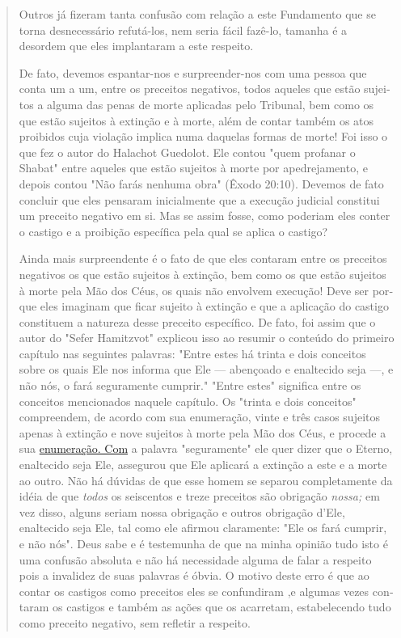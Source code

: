 \begin{quote}
Outros já fizeram tanta confusão com relação a este Fundamento que se
torna desnecessário refutá-los, nem seria fácil fazê-lo, tamanha é a
desordem que eles implantaram a este respeito.

De fato, devemos espantar-nos e surpreender-nos com uma pessoa que conta
um a um, entre os preceitos negativos, todos aqueles que estão sujei­tos
a alguma das penas de morte aplicadas pelo Tribunal, bem como os que
estão sujeitos à extinção e à morte, além de contar também os atos
proibidos cuja violação implica numa daquelas formas de morte! Foi isso
o que fez o au­tor do Halachot Guedolot. Ele contou "quem profanar o
Shabat" entre aqueles que estão sujeitos à morte por apedrejamento, e
depois contou "Não farás ne­nhuma obra" (Êxodo 20:10). Devemos de fato
concluir que eles pensaram ini­cialmente que a execução judicial
constitui um preceito negativo em si. Mas se assim fosse, como poderiam
eles conter o castigo e a proibição específica pela qual se aplica o
castigo?

Ainda mais surpreendente é o fato de que eles contaram entre os
pre­ceitos negativos os que estão sujeitos à extinção, bem como os que
estão sujei­tos à morte pela Mão dos Céus, os quais não envolvem
execução! Deve ser por­que eles imaginam que ficar sujeito à extinção e
que a aplicação do castigo cons­tituem a natureza desse preceito
específico. De fato, foi assim que o autor do "Sefer Hamitzvot" explicou
isso ao resumir o conteúdo do primeiro capítulo nas seguintes palavras:
"Entre estes há trinta e dois conceitos sobre os quais Ele nos informa
que Ele --- abençoado e enaltecido seja ---, e não nós, o fará
seguramente cumprir." "Entre estes" significa entre os conceitos
mencionados naquele capítulo. Os "trinta e dois conceitos" compreendem,
de acordo com sua enumeração, vinte e três casos sujeitos apenas à
extinção e nove sujeitos à morte pela Mão dos Céus, e procede a sua
\href{http://enumeração.Com}{{enumeração. Com}} a palavra "segu­ramente"
ele quer dizer que o Eterno, enaltecido seja Ele, assegurou que Ele
aplicará a extinção a este e a morte ao outro. Não há dúvidas de que
esse ho­mem se separou completamente da idéia de que \emph{todos} os
seiscentos e treze pre­ceitos são obrigação \emph{nossa;} em vez disso,
alguns seriam nossa obrigação e ou­tros obrigação d'Ele, enaltecido seja
Ele, tal como ele afirmou claramente: "Ele os fará cumprir, e não nós".
Deus sabe e é testemunha de que na minha opi­nião tudo isto é uma
confusão absoluta e não há necessidade alguma de falar a respeito pois a
invalidez de suas palavras é óbvia. O motivo deste erro é que ao contar
os castigos como preceitos eles se confundiram ,e algumas vezes
con­taram os castigos e também as ações que os acarretam, estabelecendo
tudo co­mo preceito negativo, sem refletir a respeito.


\end{quote}
